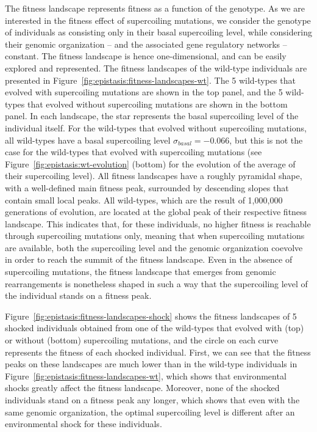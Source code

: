 The fitness landscape represents fitness as a function of the genotype.
As we are interested in the fitness effect of supercoiling mutations, we consider the genotype of individuals as consisting only in their basal supercoiling level, while considering their genomic organization -- and the associated gene regulatory networks -- constant.
The fitness landscape is hence one-dimensional, and can be easily explored and represented.
The fitness landscapes of the wild-type individuals are presented in Figure~\ref{fig:epistasis:fitness-landscapes-wt}.
The 5 wild-types that evolved with supercoiling mutations are shown in the top panel, and the 5 wild-types that evolved without supercoiling mutations are shown in the bottom panel.
In each landscape, the star represents the basal supercoiling level of the individual itself.
For the wild-types that evolved without supercoiling mutations, all wild-types have a basal supercoiling level $\sigma_{basal} = -0.066$, but this is not the case for the wild-types that evolved with supercoiling mutations (see Figure~\ref{fig:epistasis:wt-evolution} (bottom) for the evolution of the average of their supercoiling level).
All fitness landscapes have a roughly pyramidal shape, with a well-defined main fitness peak, surrounded by descending slopes that contain small local peaks.
All wild-types, which are the result of 1,000,000 generations of evolution, are located at the global peak of their respective fitness landscape.
This indicates that, for these individuals, no higher fitness is reachable through supercoiling mutations only, meaning that when supercoiling mutations are available, both the supercoiling level and the genomic organization coevolve in order to reach the summit of the fitness landscape.
Even in the absence of supercoiling mutations, the fitness landscape that emerges from genomic rearrangements is nonetheless shaped in such a way that the supercoiling level of the individual stands on a fitness peak.

Figure~\ref{fig:epistasis:fitness-landscapes-shock} shows the fitness landscapes of 5 shocked individuals obtained from one of the wild-types that evolved with (top) or without (bottom) supercoiling mutations, and the circle on each curve represents the fitness of each shocked individual.
First, we can see that the fitness peaks on these landscapes are much lower than in the wild-type individuals in Figure~\ref{fig:epistasis:fitness-landscapes-wt}, which shows that environmental shocks greatly affect the fitness landscape.
Moreover, none of the shocked individuals stand on a fitness peak any longer, which shows that even with the same genomic organization, the optimal supercoiling level is different after an environmental shock for these individuals.

